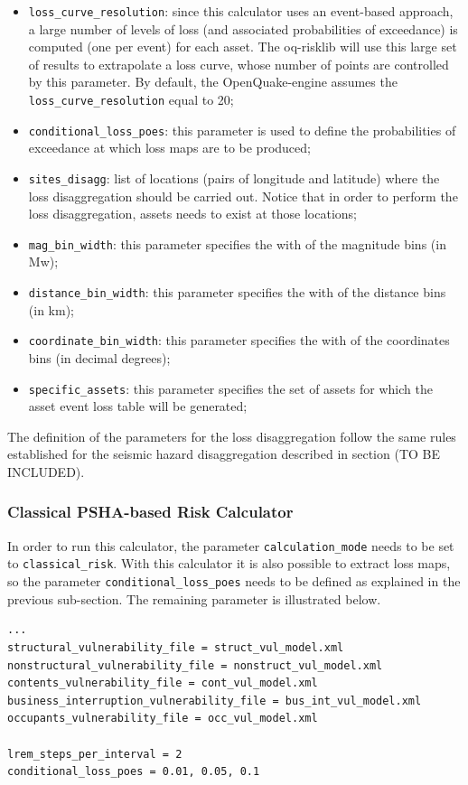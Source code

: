 \begin{itemize}
\item \Verb+loss_curve_resolution+: since this calculator uses an event\--based ap\-proach, a large number of levels of loss (and associated probabilities of exceedance) is computed (one per event) for each asset. The oq-risklib will use this large set of results to extrapolate a loss curve, whose number of points are controlled by this parameter. By default, the OpenQuake-engine assumes the \Verb+loss_curve_resolution+ equal to 20;
\item  \Verb+conditional_loss_poes+: this parameter is used to define the probabilities of exceedance at which loss maps are to be produced;
\item  \Verb+sites_disagg+: list of locations (pairs of longitude and latitude) where the loss disaggregation should be carried out. Notice that in order to perform the loss disaggregation, assets needs to exist at those locations;
\item  \Verb+mag_bin_width+: this parameter specifies the with of the magnitude bins (in Mw);
\item  \Verb+distance_bin_width+: this parameter specifies the with of the distance bins (in km);
\item  \Verb+coordinate_bin_width+: this parameter specifies the with of the coordinates bins (in decimal degrees);
\item  \Verb+specific_assets+: this parameter specifies the set of assets for which the asset event loss table will be generated;
\end{itemize}

The definition of the parameters for the loss disaggregation follow the same rules established for the seismic hazard disaggregation described in section (TO BE INCLUDED).

\subsubsection{Classical PSHA-based Risk Calculator}
In order to run this calculator, the parameter \Verb+calculation_mode+ needs to be set to \Verb+classical_risk+. With this calculator it is also possible to extract loss maps, so the parameter \Verb+conditional_loss_poes+ needs to be defined as explained in the previous sub-section. The remaining parameter is illustrated below.
\begin{Verbatim}[frame=single, commandchars=\\\{\}, samepage=true]
...
structural_vulnerability_file = struct_vul_model.xml
nonstructural_vulnerability_file = nonstruct_vul_model.xml
contents_vulnerability_file = cont_vul_model.xml
business_interruption_vulnerability_file = bus_int_vul_model.xml
occupants_vulnerability_file = occ_vul_model.xml

lrem_steps_per_interval = 2
conditional_loss_poes = 0.01, 0.05, 0.1
\end{Verbatim}


